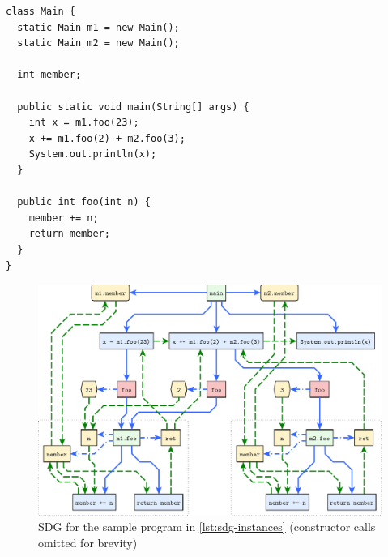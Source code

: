 \begin{lstlisting}[float=p,label=lst:sdg-instances,
  caption={Program illustrating instances resulting in the SDG in \autoref{fig:sdg-instances}}]
class Main {
  static Main m1 = new Main();
  static Main m2 = new Main();
  
  int member;
  
  public static void main(String[] args) {
    int x = m1.foo(23);
    x += m1.foo(2) + m2.foo(3);
    System.out.println(x);
  }
  
  public int foo(int n) {
    member += n;
    return member;
  }
}
\end{lstlisting}

\begin{figure}[p]
  \centering
    \includegraphics[scale=0.6]{sdgs/instances}
  \caption{SDG for the sample program in \autoref{lst:sdg-instances} (constructor calls omitted for brevity)}
  \label{fig:sdg-instances}
\end{figure}
